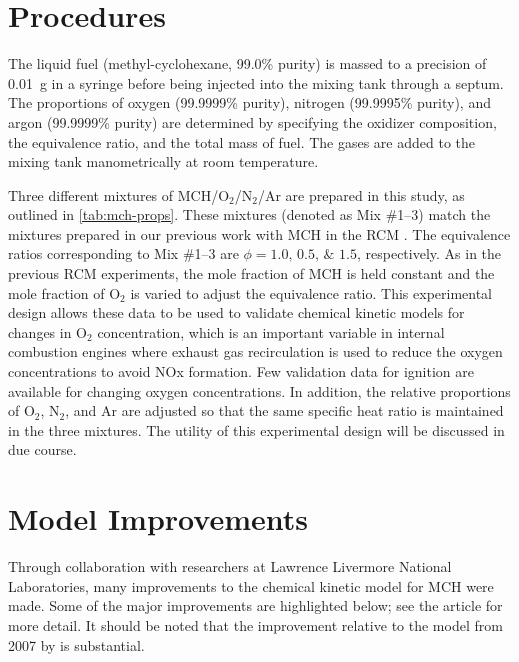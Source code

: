 \documentclass[12pt, letterpaper]{article}
\begin{document}
\section{Procedures}
\label{sec:mch}

The liquid fuel (methyl-cyclohexane, 99.0\% purity) is massed to a precision
of \SI{0.01}{\gram} in a syringe before being injected into the mixing tank through a
septum. The proportions of oxygen (99.9999\% purity), nitrogen (99.9995\%
purity), and argon (99.9999\% purity) are determined by specifying the oxidizer
composition, the equivalence ratio, and the total mass of fuel. The gases are
added to the mixing tank manometrically at room temperature.

Three different mixtures of MCH/O$_2$/N$_2$/Ar are prepared in this study, as
outlined in \autoref{tab:mch-props}. These mixtures (denoted as Mix \#1--3) match the mixtures
prepared in our previous work with MCH in the RCM \cite{Mittal2009}. The equivalence ratios
corresponding to Mix \#1--3 are $\phi=\numlist{1.0;0.5;1.5}$, respectively.
As in the previous RCM experiments, the mole fraction of MCH is held constant
and the mole fraction of O$_2$ is varied to adjust the equivalence ratio. This
experimental design allows these data to be used to validate chemical kinetic
models for changes in O$_2$ concentration, which is an important variable in
internal combustion engines where exhaust gas recirculation is used to reduce
the oxygen concentrations to avoid NOx formation. Few validation data for
ignition are available for changing oxygen concentrations. In addition, the
relative proportions of O$_2$, N$_2$, and Ar are adjusted so that the same specific
heat ratio is maintained in the three mixtures. The utility of this
experimental design will be discussed in due course.

\section{Model Improvements}
\label{sec:model-improvements}

Through collaboration with researchers at Lawrence Livermore National
Laboratories, many improvements to the chemical kinetic model for MCH were
made. Some of the major improvements are highlighted below; see the article
for more detail. It should be noted that the improvement relative to the model
from 2007 by \textcite{Pitz2007} is substantial.
\end{document}
